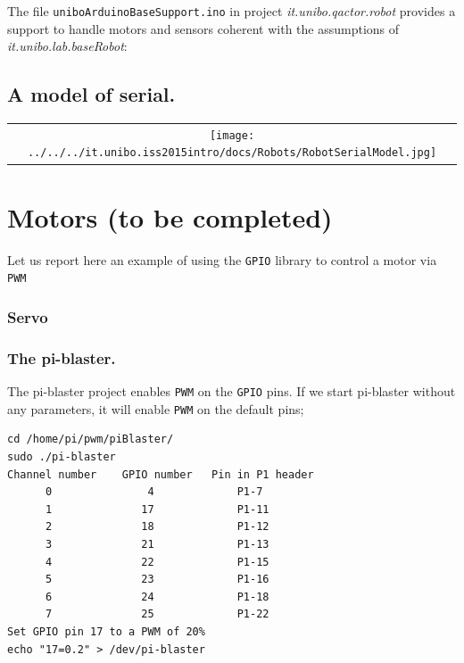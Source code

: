 The file \texttt{uniboArduinoBaseSupport.ino} in project \textit{it.unibo.qactor.robot} provides a support to handle motors and sensors coherent with  the assumptions of \textit{it.unibo.lab.baseRobot}:
 


\subsection{A model of serial.}

\begin{center}
\begin{tabular}{ c }
     \texttt{[image: ../../../it.unibo.iss2015intro/docs/Robots/RobotSerialModel.jpg]}\\
\end{tabular} 
\end{center}

\newpage   
\section{Motors (to be completed)}

Let us report here an example of using the \texttt{GPIO} library to control a motor via \texttt{PWM}



\subsubsection{Servo}

\subsubsection{The pi-blaster.}
The pi-blaster project enables \texttt{PWM} on the \texttt{GPIO} pins. If we start pi-blaster without any parameters, it will enable \texttt{PWM} on the default pins;
\begin{verbatim}
cd /home/pi/pwm/piBlaster/
sudo ./pi-blaster
Channel number    GPIO number   Pin in P1 header
      0               4             P1-7
      1              17             P1-11
      2              18             P1-12
      3              21             P1-13
      4              22             P1-15
      5              23             P1-16
      6              24             P1-18
      7              25             P1-22
Set GPIO pin 17 to a PWM of 20%
echo "17=0.2" > /dev/pi-blaster
\end{verbatim}      

